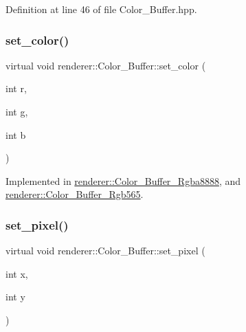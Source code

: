 Definition at line 46 of file Color\+\_\+\+Buffer.\+hpp.

\mbox{\label{classrenderer_1_1_color___buffer_ac99a897d15211d3754e343928412b765}} 
\subsubsection{\texorpdfstring{set\_color()}{set\_color()}}
{\footnotesize\ttfamily virtual void renderer\+::\+Color\+\_\+\+Buffer\+::set\+\_\+color (\begin{DoxyParamCaption}\item[{int}]{r,  }\item[{int}]{g,  }\item[{int}]{b }\end{DoxyParamCaption})\hspace{0.3cm}{\ttfamily [pure virtual]}}



Implemented in \mbox{\hyperlink{classrenderer_1_1_color___buffer___rgba8888_abaeb5e608f4cd3803185de47558bdc58}{renderer\+::\+Color\+\_\+\+Buffer\+\_\+\+Rgba8888}}, and \mbox{\hyperlink{classrenderer_1_1_color___buffer___rgb565_aad9ed69a24b11f14f7efb6fc81bd82e7}{renderer\+::\+Color\+\_\+\+Buffer\+\_\+\+Rgb565}}.

\mbox{\label{classrenderer_1_1_color___buffer_a383c851cb75200d8924857b1b28a675e}} 
\subsubsection{\texorpdfstring{set\_pixel()}{set\_pixel()}\hspace{0.1cm}{\footnotesize\ttfamily [1/2]}}
{\footnotesize\ttfamily virtual void renderer\+::\+Color\+\_\+\+Buffer\+::set\+\_\+pixel (\begin{DoxyParamCaption}\item[{int}]{x,  }\item[{int}]{y }\end{DoxyParamCaption})\hspace{0.3cm}{\ttfamily [pure virtual]}}




